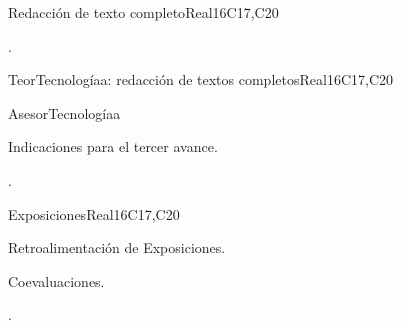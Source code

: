 \begin{syllabus}
\begin{unit}{Redacción de texto completo}{}{Real}{16}{C17,C20}
  \begin{learningoutcomes}
   \item .%
  \end{learningoutcomes}
\end{unit}

\begin{unit}{TeorTecnologíaa: redacción de textos completos}{}{Real}{16}{C17,C20}
  \begin{topics}
      \item AsesorTecnologíaa
      \item Indicaciones para el tercer avance.
  \end{topics}

  \begin{learningoutcomes}
   \item .%
  \end{learningoutcomes}
\end{unit}

\begin{unit}{Exposiciones}{}{Real}{16}{C17,C20}
  \begin{topics}
      \item Retroalimentación de Exposiciones.
      \item Coevaluaciones.
  \end{topics}

  \begin{learningoutcomes}
   \item .%
  \end{learningoutcomes}
\end{unit}

\begin{coursebibliography}
\end{coursebibliography}

\end{syllabus}
